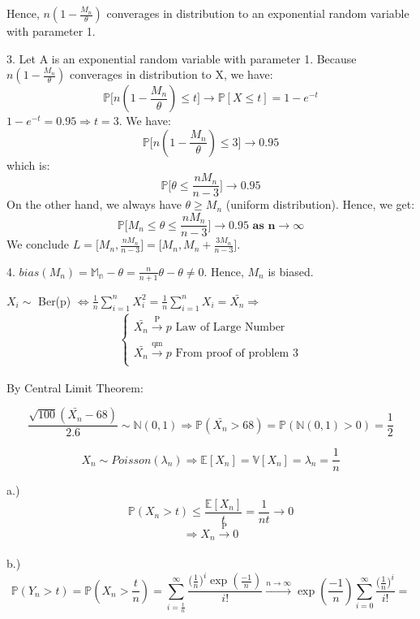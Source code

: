 \documentclass[10pt]{article}
\newenvironment{problem}[2][Problem]{\begin{trivlist}
\item[\hskip \labelsep {\bfseries #1}\hskip \labelsep {\bfseries #2.}]}{\end{trivlist}}
\begin{document}
\begin{problem}{4}
Hence, $n(1-\frac{M_n}{\theta})$ converages in distribution to an exponential random variable with parameter 1.
\item 3.
Let A is an exponential random variable with parameter 1. Because $n(1-\frac{M_n}{\theta})$ converages in distribution to X, we have:
\[\mathbb{P}\Big[ n(1-\frac{M_n}{\theta}) \leqslant t\Big] \rightarrow \mathbb{P}[X\leqslant t]= 1-e^{-t} \]
$1-e^{-t}=0.95 \Rightarrow t=3$. We have:
\[ \mathbb{P}\Big[ n(1-\frac{M_n}{\theta}) \leqslant 3\Big] \rightarrow 0.95\]
which is:
\[ \mathbb{P}\Big[ \theta \leqslant \frac{nM_n}{n-3}\Big] \rightarrow 0.95\]
On the other hand, we always have $\theta \geqslant M_n$ (uniform distribution). Hence, we get: 
\[ \mathbb{P}\Big[M_n \leqslant \theta \leqslant \frac{nM_n}{n-3}\Big] \rightarrow 0.95 \textbf{ as n} \rightarrow \infty\]
We conclude $L=\Big[M_n, \frac{nM_n}{n-3} \Big]=\Big[ M_n, M_n+ \frac{3M_n}{n-3} \Big]$.
\item 4.
$bias(M_n)=\mathbb{M_n}-\theta= \frac{n}{n+1}\theta -\theta \neq 0$. Hence, $M_n$ is biased.
\end{problem}

\begin{problem}{5}

$X_i \sim $ Ber(p) $\Longleftrightarrow \frac{1}{n} \sum_{i=1}^{n} X_i^2=\frac{1}{n} \sum_{i=1}^{n} X_i= \bar{X_n} \Rightarrow$
\begin{align}
    \begin{cases}
        \bar{X_n} \xrightarrow[]{\text{P}} p \text{ Law of Large Number} \\
        \bar{X_n} \xrightarrow[]{\text{qm}} p \text{ From proof of problem 3}        
    \end{cases}
\end{align}

\end{problem}

\begin{problem}{6}

By Central Limit Theorem:

\[\frac{\sqrt{100}(\bar{X_n}-68)}{2.6} \sim \mathbb{N}(0,1) \Longrightarrow \mathbb{P}(\bar{X_n} > 68)= \mathbb{P}(\mathbb{N}(0,1)>0)=\frac{1}{2}\]
\end{problem}

\begin{problem}{7}



\[X_n \sim Poisson(\lambda_n) \Rightarrow \mathbb{E}[X_n]= \mathbb{V}[X_n]= \lambda_n=\frac{1}{n}\]

a.) \\

\[\mathbb{P}(X_n > t) \leqslant \frac{\mathbb{E}[X_n]}{t}=\frac{1}{nt} \rightarrow 0\]
\[ \Rightarrow X_n \xrightarrow[]{\text{P}} 0\]

b.)\\

\[\mathbb{P}(Y_n > t) =\mathbb{P}(X_n > \frac{t}{n})=\sum_{i=\frac{t}{n}}^{\infty}\frac{\big(\frac{1}{n} \big)^i \exp(\frac{-1}{n})}{i!} \xrightarrow[]{n\rightarrow \infty} \exp(\frac{-1}{n})\sum_{i=0}^{\infty}\frac{\big(\frac{1}{n}\big)^i}{i!}= \]
\end{problem}
\end{document}
